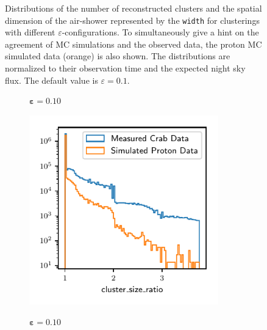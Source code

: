 \begin{figure}
\begin{subfigure}{0.5\textwidth}
  \end{subfigure}
  \caption{Distributions of the number of reconstructed
  clusters and the spatial dimension of the air-shower represented by the
  \texttt{width} for clusterings with different $\varepsilon$-configurations. To simultaneously give a hint on the agreement of MC simulations and the observed data, the proton MC simulated data (orange) is also shown. The distributions are normalized to their observation time and the expected night sky flux. The default value is $\varepsilon = 0.1$.}
  \label{fig:eps_feat1}
\end{figure}
%
%
\begin{figure}
  \begin{subfigure}{0.5\textwidth}
    \centering
    $\symbf{\varepsilon = 0.10}$\par\smallskip
    \includegraphics[width=0.9\textwidth, page=23]{Plots/Epsilon/10_comparison.pdf}
  \end{subfigure}
  \begin{subfigure}{0.5\textwidth}
    \centering
    $\symbf{\varepsilon = 0.10}$\par\smallskip

\end{subfigure}
\end{figure}
